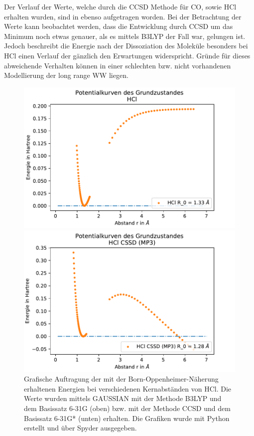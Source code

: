 Der Verlauf der Werte, welche durch die CCSD Methode für CO, sowie HCl erhalten wurden, sind in ebenso aufgetragen worden. Bei der Betrachtung der Werte kann beobachtet werden, dass die Entwicklung durch CCSD um das Minimum noch etwas genauer, als es mittels B3LYP der Fall war, gelungen ist. Jedoch beschreibt die Energie  nach der Dissoziation des Moleküle besonders bei HCl einen Verlauf der gänzlich den Erwartungen widerspricht. Gründe für dieses abweichende Verhalten können in einer schlechten bzw. nicht vorhandenen Modellierung der long range WW liegen.
 
\begin{figure}[H]
	\center
	\begin{minipage}{0.8\textwidth}
	\includegraphics[width=\textwidth]{Bilder/HCl_b3lyp.pdf}
	
	\end{minipage}
\begin{minipage}{0.8\textwidth}
	\includegraphics[width=\textwidth]{Bilder/HCl_CSSD(MP3).pdf}
	
	\end{minipage}	
	\caption{Grafische Auftragung der mit der Born-Oppenheimer-Näherung erhaltenen Energien bei verschiedenen Kernabständen von HCl. Die Werte wurden mittels GAUSSIAN mit der Methode B3LYP und dem Basissatz 6-31G (oben) bzw. mit der Methode CCSD und dem Basissatz 6-31G* (unten) erhalten. Die Grafiken wurde mit Python erstellt und über Spyder ausgegeben.}
	\label{hcl}
		
	
\end{figure}
	

